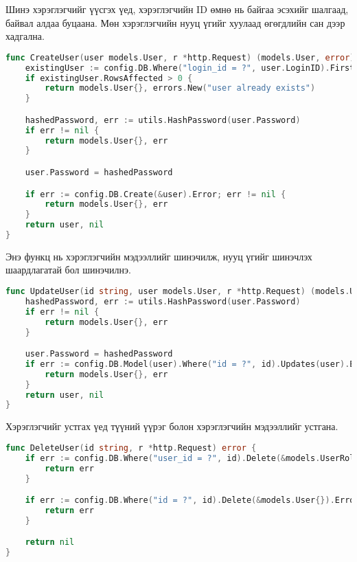 Шинэ хэрэглэгчийг үүсгэх үед, хэрэглэгчийн ID өмнө нь байгаа эсэхийг шалгаад, байвал алдаа буцаана. Мөн хэрэглэгчийн нууц үгийг хуулаад өгөгдлийн сан дээр хадгална.
\begin{lstlisting}[language=Go, caption=Create User Service, frame=single]
func CreateUser(user models.User, r *http.Request) (models.User, error) {
	existingUser := config.DB.Where("login_id = ?", user.LoginID).First(&models.User{})
	if existingUser.RowsAffected > 0 {
		return models.User{}, errors.New("user already exists")
	}

	hashedPassword, err := utils.HashPassword(user.Password)
	if err != nil {
		return models.User{}, err
	}

	user.Password = hashedPassword

	if err := config.DB.Create(&user).Error; err != nil {
		return models.User{}, err
	}
	return user, nil
}
\end{lstlisting}

Энэ функц нь хэрэглэгчийн мэдээллийг шинэчилж, нууц үгийг шинэчлэх шаардлагатай бол шинэчилнэ.
\begin{lstlisting}[language=Go, caption=Update User Service, frame=single]
func UpdateUser(id string, user models.User, r *http.Request) (models.User, error) {
	hashedPassword, err := utils.HashPassword(user.Password)
	if err != nil {
		return models.User{}, err
	}

	user.Password = hashedPassword
	if err := config.DB.Model(user).Where("id = ?", id).Updates(user).Error; err != nil {
		return models.User{}, err
	}
	return user, nil
}
\end{lstlisting}

Хэрэглэгчийг устгах үед түүний үүрэг болон хэрэглэгчийн мэдээллийг устгана.
\begin{lstlisting}[language=Go, caption=Delete User Service, frame=single]
func DeleteUser(id string, r *http.Request) error {
	if err := config.DB.Where("user_id = ?", id).Delete(&models.UserRole{}).Error; err != nil {
		return err
	}

	if err := config.DB.Where("id = ?", id).Delete(&models.User{}).Error; err != nil {
		return err
	}

	return nil
}
\end{lstlisting}

